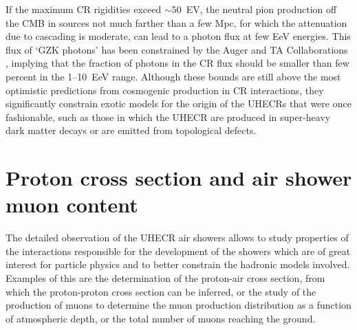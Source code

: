 \documentclass[twoside,12pt]{article}
\begin{document}
If the maximum CR rigidities exceed $\sim 50$~EV, the neutral pion production off the CMB in sources not much farther than a few Mpc, for which the attenuation due to cascading is moderate, can lead to a photon flux at few EeV energies. This flux of `GZK photons' has been constrained by the Auger and TA Collaborations \cite{gammaa,gammata}, implying that  the fraction of photons in the CR flux should be smaller than few percent in the 1--10~EeV range. Although these bounds are still above the most optimistic predictions from cosmogenic production in CR interactions, they  significantly constrain exotic models for the origin of the UHECRs that  were once fashionable, such as those in which the UHECR are produced in super-heavy dark matter decays or are emitted from topological defects.

\section{Proton cross section and air shower muon content}

The detailed observation of the UHECR air showers allows to study properties of the interactions responsible for the development of the showers which are of great interest for particle physics and to better constrain the hadronic models involved. Examples of this are the determination of the  proton-air cross section, from which the proton-proton cross section can be inferred, or the study of the production of muons to determine the muon production distribution as a function of atmospheric depth, or the total number of muons reaching the ground.
\end{document}

